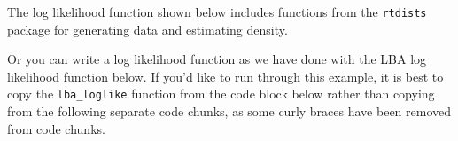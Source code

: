 \documentclass[]{book}
\newenvironment{Shaded}{\begin{snugshade}}{\end{snugshade}}
\newcommand{\ControlFlowTok}[1]{\textcolor[rgb]{0.13,0.29,0.53}{\textbf{#1}}}
\newcommand{\DataTypeTok}[1]{\textcolor[rgb]{0.13,0.29,0.53}{#1}}
\newcommand{\FloatTok}[1]{\textcolor[rgb]{0.00,0.00,0.81}{#1}}
\newcommand{\KeywordTok}[1]{\textcolor[rgb]{0.13,0.29,0.53}{\textbf{#1}}}
\newcommand{\NormalTok}[1]{#1}
\newcommand{\OperatorTok}[1]{\textcolor[rgb]{0.81,0.36,0.00}{\textbf{#1}}}
\newcommand{\OtherTok}[1]{\textcolor[rgb]{0.56,0.35,0.01}{#1}}
\newcommand{\StringTok}[1]{\textcolor[rgb]{0.31,0.60,0.02}{#1}}
\begin{document}
The log likelihood function shown below includes functions from the \texttt{rtdists} package for generating data and estimating density.

Or you can write a log likelihood function as we have done with the LBA log likelihood function below. If you'd like to run through this example, it is best to copy the \texttt{lba\_loglike} function from the code block below rather than copying from the following separate code chunks, as some curly braces have been removed from code chunks.

\begin{Shaded}
\end{Shaded}
\end{document}
